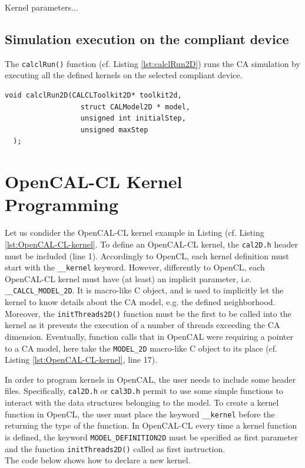 Kernel parameters...




\subsection{Simulation execution on the compliant device}

The \verb'calclRun()' function (cf. Listing \ref{lst:calclRun2D}) runs the CA simulation by executing
all the defined kernels on the selected compliant device.

\begin{lstlisting}[float,floatplacement=H, label=lst:calclRun2D, caption=The calclRun2D function., numbers=none]
  void calclRun2D(CALCLToolkit2D* toolkit2d,
                  struct CALModel2D * model,
                  unsigned int initialStep,
                  unsigned maxStep
  );
\end{lstlisting}


\section{OpenCAL-CL Kernel Programming}

Let us condider the OpenCAL-CL kernel example in Listing (cf. Listing
\ref{lst:OpenCAL-CL-kernel}. To define an OpenCAL-CL kernel, the
\verb'cal2D.h' header must be included (line 1). Accordingly to OpenCL, each
kernel definition must start with the \verb'__kernel'
keyword. However, differently to OpenCL, each OpenCAL-CL kernel must
have (at least) an implicit parameter,
i.e. \verb'__CALCL_MODEL_2D'. It is macro-like C object, and is used
to implicitly let the kernel to know details about the CA model,
e.g. the defined neighborhood. Moreover, the \verb'initThreads2D()'
function must be the first to be called into the kernel as it prevents
the execution of a number of threads exceeding the CA
dimension. Eventually, function calls that in OpenCAL were requiring a
pointer to a CA model, here take the \verb'MODEL_2D' macro-like C
object to its place (cf. Listing \ref{lst:OpenCAL-CL-kernel}, line
17).


In order to program kernels in OpenCAL, the user needs to include some
header files. Specifically, \verb'cal2D.h' or \verb'cal3D.h' permit
to use some simple functions to interact with the data structures
belonging to the model. To create a kernel function in OpenCL, the user
must place the keyword \verb'__kernel' before the returning the type
of the function. In OpenCAL-CL every time a kernel function is defined, the
keyword \verb'MODEL_DEFINITION2D' must be specified as first parameter
and the function \verb'initThreads2D()' called as first
instruction.\\ The code below shows how to declare a new kernel.

